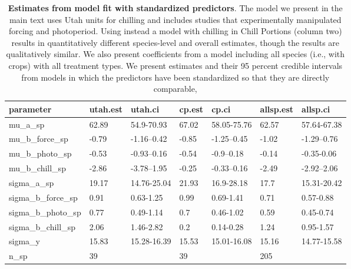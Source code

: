 \documentclass{article}
\begin{document}
\begin{table}[ht]
\centering
\caption{\textbf{Estimates from model fit with standardized predictors}. The model we present in the main text uses Utah units for chilling and includes studies that experimentally manipulated forcing and photoperiod. Using instead a model with chilling in Chill Portions (column two) results in quantitatively different species-level and overall estimates, though the results are qualitatively similar. We also present coefficients from a model including all species (i.e., with crops) with all treatment types. We present estimates and their 95 percent credible intervals from models in which the predictors have been standardized so that they are directly comparable,} 
\label{tab:methods}
\begingroup\footnotesize
\begin{tabular}{|p{}|p{}|p{}|p{}|p{}|p{}|p{}|}
  \hline
parameter & utah.est & utah.ci & cp.est & cp.ci & allsp.est & allsp.ci \\ 
  \hline
mu\_a\_sp & 62.89 & 54.9-70.93 & 67.02 & 58.05-75.76 & 62.57 & 57.64-67.38 \\ 
  mu\_b\_force\_sp & -0.79 & -1.16--0.42 & -0.85 & -1.25--0.45 & -1.02 & -1.29--0.76 \\ 
  mu\_b\_photo\_sp & -0.53 & -0.93--0.16 & -0.54 & -0.9--0.18 & -0.14 & -0.35-0.06 \\ 
  mu\_b\_chill\_sp & -2.86 & -3.78--1.95 & -0.25 & -0.33--0.16 & -2.49 & -2.92--2.06 \\ 
  sigma\_a\_sp & 19.17 & 14.76-25.04 & 21.93 & 16.9-28.18 & 17.7 & 15.31-20.42 \\ 
  sigma\_b\_force\_sp & 0.91 & 0.63-1.25 & 0.99 & 0.69-1.41 & 0.71 & 0.57-0.88 \\ 
  sigma\_b\_photo\_sp & 0.77 & 0.49-1.14 & 0.7 & 0.46-1.02 & 0.59 & 0.45-0.74 \\ 
  sigma\_b\_chill\_sp & 2.06 & 1.46-2.82 & 0.2 & 0.14-0.28 & 1.24 & 0.95-1.57 \\ 
  sigma\_y & 15.83 & 15.28-16.39 & 15.53 & 15.01-16.08 & 15.16 & 14.77-15.58 \\ 
   \hline
n\_sp & 39 &  & 39 &  & 205 &  \\ 
   \hline
\end{tabular}
\endgroup
\end{table}%
\end{document}
